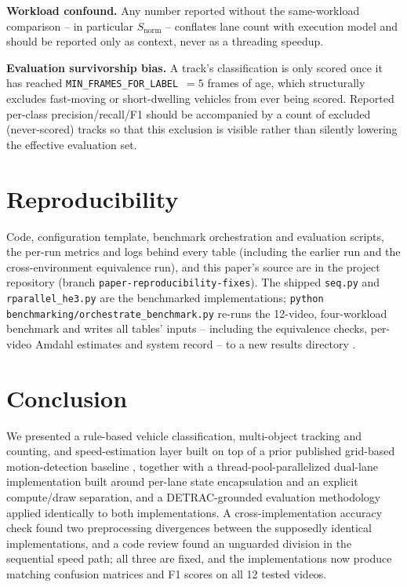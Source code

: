 \documentclass[conference]{IEEEtran}
\newcommand{\code}[1]{\texttt{#1}}
\begin{document}
\textbf{Workload confound.} Any number reported without the
same-workload comparison -- in particular $S_{\text{norm}}$ -- conflates
lane count with execution model and should be reported only as context,
never as a threading speedup.

\textbf{Evaluation survivorship bias.} A track's classification is only
scored once it has reached \code{MIN\_FRAMES\_FOR\_LABEL}~$=5$ frames of
age, which structurally excludes fast-moving or short-dwelling vehicles
from ever being scored. Reported per-class precision/recall/F1 should be
accompanied by a count of excluded (never-scored) tracks so that this
exclusion is visible rather than silently lowering the effective
evaluation set.

\section{Reproducibility}
\label{sec:repro}
Code, configuration template, benchmark orchestration and evaluation
scripts, the per-run metrics and logs behind every table (including the
earlier run and the cross-environment equivalence run), and this paper's
source are in the project repository (branch
\code{paper-reproducibility-fixes}). The shipped \code{seq.py} and
\code{rparallel\_he3.py} are the benchmarked implementations;
\code{python benchmarking/orchestrate\_benchmark.py} re-runs the
12-video, four-workload benchmark and writes all tables' inputs --
including the equivalence checks, per-video Amdahl estimates and system
record -- to a new results directory \cite{beyer2019}.

\section{Conclusion}
\label{sec:conclusion}

We presented a rule-based vehicle classification, multi-object
tracking and counting, and speed-estimation layer built on top of a
prior published grid-based motion-detection baseline \cite{baseline},
together with a thread-pool-parallelized dual-lane implementation built
around per-lane state encapsulation and an explicit compute/draw
separation, and a DETRAC-grounded evaluation methodology applied
identically to both implementations. A cross-implementation accuracy
check found two preprocessing divergences between the supposedly
identical implementations, and a code review found an unguarded division
in the sequential speed path; all three are fixed, and the
implementations now produce matching confusion matrices and F1 scores on
all 12 tested videos.
\end{document}
